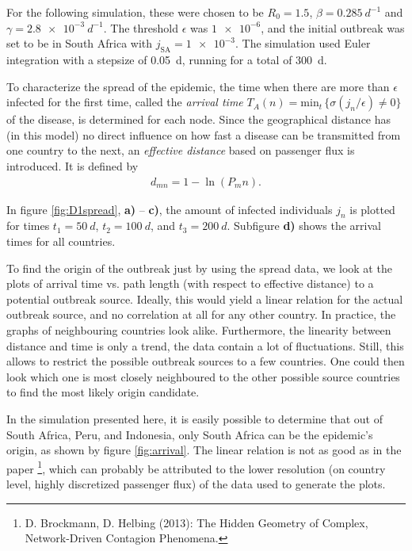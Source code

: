 \documentclass{scrartcl}
\begin{document}
For the following simulation, these were chosen to be $R_0 = 1.5$, $\beta = \SI{0.285}{d^{-1}}$ and $\gamma = \SI{2.8e-3}{d^{-1}}$.
The threshold $\epsilon$ was $\num{1e-6}$, and the initial outbreak was set to be in South Africa with $j_{\mathrm{SA}} = \num{1e-3}$. The simulation used Euler integration with a stepsize of \SI{0.05}{d}, running for a total of \SI{300}{d}.

To characterize the spread of the epidemic, the time when there are more than $\epsilon$ infected for the first time, called the \emph{arrival time} $T_A(n) = \mathrm{min}_t \, \{ \sigma(j_n / \epsilon) \neq 0 \}$ of the disease, is determined for each node. Since the geographical distance has (in this model) no direct influence on how fast a disease can be transmitted from one country to the next, an \emph{effective distance} based on passenger flux is introduced. It is defined by
\begin{align}
	d_{mn} = 1 - \ln (P_mn). \label{eq:epl}
\end{align}

In figure \ref{fig:D1spread}, \textbf{a)} -- \textbf{c)}, the amount of infected individuals $j_n$ is plotted for times $t_1=\SI{50}{d}$, $t_2 = \SI{100}{d}$, and $t_3 = \SI{200}{d}$. Subfigure \textbf{d)} shows the arrival times for all countries.

To find the origin of the outbreak just by using the spread data, we look at the plots of arrival time vs. path length (with respect to effective distance) to a potential outbreak source. 
Ideally, this would yield a linear relation for the actual outbreak source, and no correlation at all for any other country. In practice, the graphs of neighbouring countries look alike. 
Furthermore, the linearity between distance and time is only a trend, the data contain a lot of fluctuations.
Still, this allows to restrict the possible outbreak sources to a few countries. One could then look which one is most closely neighboured to the other possible source countries to find the most likely origin candidate.

In the simulation presented here, it is easily possible to determine that out of South Africa, Peru, and Indonesia, only South Africa can be the epidemic's origin, as shown by figure \ref{fig:arrival}. The linear relation is not as good as in the paper \footnote{D. Brockmann, D. Helbing (2013): The Hidden Geometry of Complex, Network-Driven Contagion Phenomena.}, which can probably be attributed to the lower resolution (on country level, highly discretized passenger flux) of the data used to generate the plots.
\end{document}
